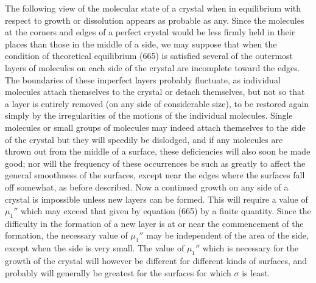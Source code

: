 \documentclass[12pt]{memoir}
\begin{document}
{The following view of the molecular state of a crystal when in equilibrium with respect to growth or dissolution appears as probable as any. Since the molecules at the corners and edges of a perfect crystal would be less firmly held in their places than those in the middle of a side, we may suppose that when the condition of theoretical equilibrium (665) is satisfied several of the outermost layers of molecules on each side of the crystal are incomplete toward the edges. The boundaries of these imperfect layers probably fluctuate, as individual molecules attach themselves to the crystal or detach themselves, but not so that a layer is entirely removed (on any side of considerable size), to be restored again simply by the irregularities of the motions of the individual molecules.  Single molecules or small groups of molecules may indeed attach themselves to the side of the crystal but they will speedily be dislodged, and if any molecules are thrown out from the middle of a surface, these deficiencies will also soon be made good; nor will the frequency of these occurrences be such as greatly to affect the general smoothness of the surfaces, except near the edges where the surfaces fall off somewhat, as before described. Now a continued growth on any side of a crystal is impossible unless new layers can be formed. This will require a value of $\mu_1''$ which may exceed that given by equation (665) by a finite quantity. Since the difficulty in the formation of a new layer is at or near the commencement of the formation, the necessary value of $\mu_1''$ may be independent of the area of the side, except when the side is very small. The value of $\mu_1''$ which is necessary for the growth of the crystal will however be different for different kinds of surfaces, and probably will generally be greatest for the surfaces for which $\sigma$ is least.

}
\end{document}
